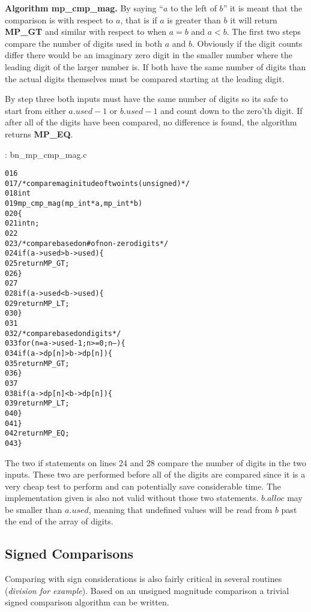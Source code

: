 \documentclass[b5paper]{book}
\begin{document}
\textbf{Algorithm mp\_cmp\_mag.}
By saying ``$a$ to the left of $b$'' it is meant that the comparison is with respect to $a$, that is if $a$ is greater than $b$ it will return
\textbf{MP\_GT} and similar with respect to when $a = b$ and $a < b$.  The first two steps compare the number of digits used in both $a$ and $b$.  
Obviously if the digit counts differ there would be an imaginary zero digit in the smaller number where the leading digit of the larger number is.  
If both have the same number of digits than the actual digits themselves must be compared starting at the leading digit.  

By step three both inputs must have the same number of digits so its safe to start from either $a.used - 1$ or $b.used - 1$ and count down to
the zero'th digit.  If after all of the digits have been compared, no difference is found, the algorithm returns \textbf{MP\_EQ}.

\vspace{+3mm}\begin{small}
\hspace{-5.1mm}{\bf File}: bn\_mp\_cmp\_mag.c
\vspace{-3mm}
\begin{alltt}
016   
017   /* compare maginitude of two ints (unsigned) */
018   int
019   mp_cmp_mag (mp_int * a, mp_int * b)
020   \{
021     int     n;
022   
023     /* compare based on # of non-zero digits */
024     if (a->used > b->used) \{
025       return MP_GT;
026     \} 
027     
028     if (a->used < b->used) \{
029       return MP_LT;
030     \}
031   
032     /* compare based on digits  */
033     for (n = a->used - 1; n >= 0; n--) \{
034       if (a->dp[n] > b->dp[n]) \{
035         return MP_GT;
036       \} 
037       
038       if (a->dp[n] < b->dp[n]) \{
039         return MP_LT;
040       \}
041     \}
042     return MP_EQ;
043   \}
\end{alltt}
\end{small}

The two if statements on lines 24 and 28 compare the number of digits in the two inputs.  These two are performed before all of the digits
are compared since it is a very cheap test to perform and can potentially save considerable time.  The implementation given is also not valid 
without those two statements.  $b.alloc$ may be smaller than $a.used$, meaning that undefined values will be read from $b$ past the end of the 
array of digits.

\subsection{Signed Comparisons}
Comparing with sign considerations is also fairly critical in several routines (\textit{division for example}).  Based on an unsigned magnitude 
comparison a trivial signed comparison algorithm can be written.
\end{document}
